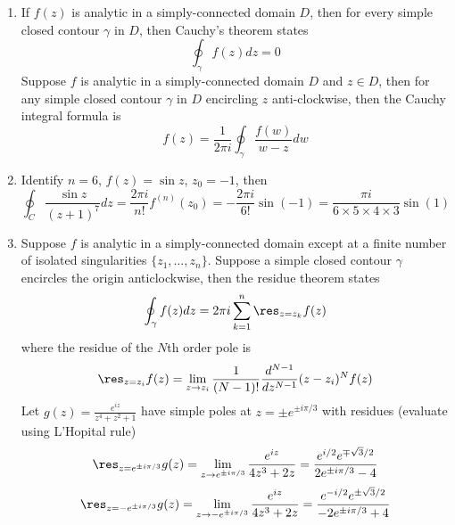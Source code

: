 \documentclass[a4paper]{article}
\begin{document}
\begin{ans}\leavevmode
\begin{enumerate}[label=(\alph*)]
\item If $f(z)$ is analytic in a simply-connected domain $D$, then for every simple closed contour $\gamma$ in $D$, then Cauchy's theorem states
$$\oint_\gamma f(z)dz=0$$
Suppose $f$ is analytic in a simply-connected domain $D$ and $z\in D$, then for any simple closed contour $\gamma$ in $D$ encircling $z$ anti-clockwise, then the Cauchy integral formula is
$$f(z)=\frac{1}{2\pi i}\oint_{\gamma}\frac{f(w)}{w-z}dw$$
\item Identify $n=6$, $f(z)=\sin z$, $z_0=-1$, then
$$\oint_C\frac{\sin z}{(z+1)^7}dz=\frac{2\pi i}{n!}f^{(n)}(z_0)=-\frac{2\pi i}{6!}\sin(-1)=\frac{\pi i}{6\times 5\times 4\times 3}\sin (1)$$
\item Suppose $f$ is analytic in a simply-connected domain except at a finite number of isolated singularities $\{z_1,\dots,z_n\}$. Suppose a simple closed contour $\gamma$ encircles the origin anticlockwise, then the residue theorem states
$$\oint_\gamma f(z)dz=2\pi i\sum_{k=1}^n\res_{z=z_k}f(z)$$
where the residue of the $N$th order pole is
$$\res_{z=z_i}f(z)=\lim_{z\rightarrow z_i}\frac{1}{(N-1)!}\frac{d^{N-1}}{dz^{N-1}}(z-z_i)^Nf(z)$$
Let $g(z)=\frac{e^{iz}}{z^4+z^2+1}$ have simple poles at $z=\pm e^{\pm i\pi/3}$ with residues (evaluate using L'Hopital rule)
$$\res_{z=e^{\pm i\pi/3}}g(z)=\lim_{z\rightarrow e^{\pm i\pi/3}}\frac{e^{iz}}{4z^3+2z}=\frac{e^{i/2}e^{\mp\sqrt{3}/2}}{2e^{\pm i\pi/3}-4}$$
$$\res_{z=-e^{\pm i\pi/3}}g(z)=\lim_{z\rightarrow -e^{\pm i\pi/3}}\frac{e^{iz}}{4z^3+2z}=\frac{e^{-i/2}e^{\pm\sqrt{3}/2}}{-2e^{\pm i\pi/3}+4}$$
\begin{center}
\end{center}
\end{enumerate}
\end{ans}
\end{document}
